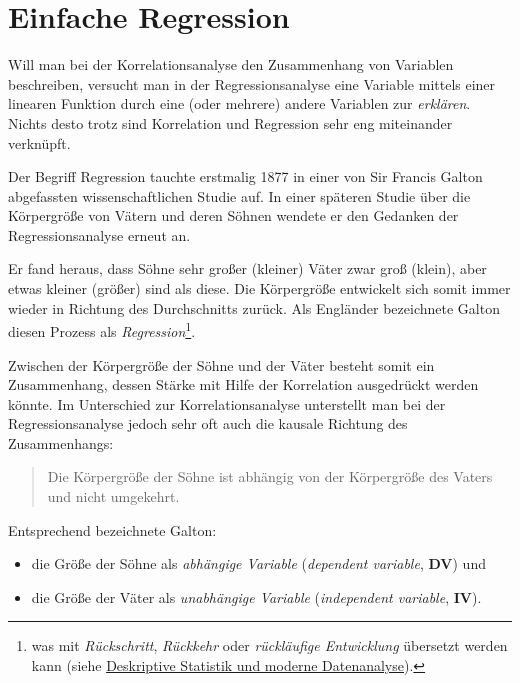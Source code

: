 \documentclass[]{article}
\providecommand{\tightlist}{%
  \setlength{\itemsep}{0pt}\setlength{\parskip}{0pt}}
\let\rmarkdownfootnote\footnote%
\def\footnote{\protect\rmarkdownfootnote}
\begin{document}
\section*{Einfache Regression}\label{einfache-regression}

Will man bei der Korrelationsanalyse den Zusammenhang von Variablen
beschreiben, versucht man in der Regressionsanalyse eine Variable
mittels einer linearen Funktion durch eine (oder mehrere) andere
Variablen zur \emph{erklären}. Nichts desto trotz sind Korrelation und
Regression sehr eng miteinander verknüpft.

Der Begriff Regression tauchte erstmalig 1877 in einer von Sir Francis
Galton abgefassten wissenschaftlichen Studie auf. In einer späteren
Studie über die Körpergröße von Vätern und deren Söhnen wendete er den
Gedanken der Regressionsanalyse erneut an.

Er fand heraus, dass Söhne sehr großer (kleiner) Väter zwar groß
(klein), aber etwas kleiner (größer) sind als diese. Die Körpergröße
entwickelt sich somit immer wieder in Richtung des Durchschnitts zurück.
Als Engländer bezeichnete Galton diesen Prozess als
\emph{Regression}\footnote{was mit \emph{Rückschritt}, \emph{Rückkehr}
  oder \emph{rückläufige Entwicklung} übersetzt werden kann (siehe
  \href{https://link.springer.com/chapter/10.1007/978-3-8349-7071-8_5}{Deskriptive
  Statistik und moderne Datenanalyse}).}.

Zwischen der Körpergröße der Söhne und der Väter besteht somit ein
Zusammenhang, dessen Stärke mit Hilfe der Korrelation ausgedrückt werden
könnte. Im Unterschied zur Korrelationsanalyse unterstellt man bei der
Regressionsanalyse jedoch sehr oft auch die kausale Richtung des
Zusammenhangs:

\begin{quote}
Die Körpergröße der Söhne ist abhängig von der Körpergröße des Vaters
und nicht umgekehrt.
\end{quote}

Entsprechend bezeichnete Galton:

\begin{itemize}
\tightlist
\item
  die Größe der Söhne als \emph{abhängige Variable} (\emph{dependent
  variable}, \textbf{DV}) und
\item
  die Größe der Väter als \emph{unabhängige Variable} (\emph{independent
  variable}, \textbf{IV}).
\end{itemize}
\end{document}
